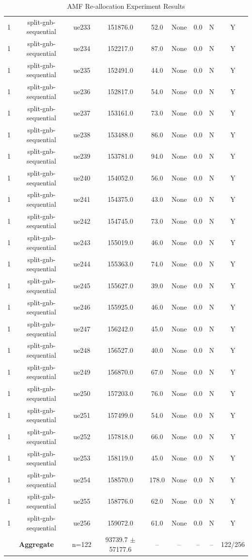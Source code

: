 \begin{table}[ht]
\begin{tabular}{|c|c|c|c|c|c|c|c|c|}
1 & split-gnb-sequential & ue233 & 151876.0 & 52.0 & None & 0.0 & N & Y \\
1 & split-gnb-sequential & ue234 & 152217.0 & 87.0 & None & 0.0 & N & Y \\
1 & split-gnb-sequential & ue235 & 152491.0 & 44.0 & None & 0.0 & N & Y \\
1 & split-gnb-sequential & ue236 & 152817.0 & 54.0 & None & 0.0 & N & Y \\
1 & split-gnb-sequential & ue237 & 153161.0 & 73.0 & None & 0.0 & N & Y \\
1 & split-gnb-sequential & ue238 & 153488.0 & 86.0 & None & 0.0 & N & Y \\
1 & split-gnb-sequential & ue239 & 153781.0 & 94.0 & None & 0.0 & N & Y \\
1 & split-gnb-sequential & ue240 & 154052.0 & 56.0 & None & 0.0 & N & Y \\
1 & split-gnb-sequential & ue241 & 154375.0 & 43.0 & None & 0.0 & N & Y \\
1 & split-gnb-sequential & ue242 & 154745.0 & 73.0 & None & 0.0 & N & Y \\
1 & split-gnb-sequential & ue243 & 155019.0 & 46.0 & None & 0.0 & N & Y \\
1 & split-gnb-sequential & ue244 & 155363.0 & 74.0 & None & 0.0 & N & Y \\
1 & split-gnb-sequential & ue245 & 155627.0 & 39.0 & None & 0.0 & N & Y \\
1 & split-gnb-sequential & ue246 & 155925.0 & 46.0 & None & 0.0 & N & Y \\
1 & split-gnb-sequential & ue247 & 156242.0 & 45.0 & None & 0.0 & N & Y \\
1 & split-gnb-sequential & ue248 & 156527.0 & 40.0 & None & 0.0 & N & Y \\
1 & split-gnb-sequential & ue249 & 156870.0 & 67.0 & None & 0.0 & N & Y \\
1 & split-gnb-sequential & ue250 & 157203.0 & 76.0 & None & 0.0 & N & Y \\
1 & split-gnb-sequential & ue251 & 157499.0 & 54.0 & None & 0.0 & N & Y \\
1 & split-gnb-sequential & ue252 & 157818.0 & 66.0 & None & 0.0 & N & Y \\
1 & split-gnb-sequential & ue253 & 158119.0 & 45.0 & None & 0.0 & N & Y \\
1 & split-gnb-sequential & ue254 & 158570.0 & 178.0 & None & 0.0 & N & Y \\
1 & split-gnb-sequential & ue255 & 158776.0 & 62.0 & None & 0.0 & N & Y \\
1 & split-gnb-sequential & ue256 & 159072.0 & 61.0 & None & 0.0 & N & Y \\
\multicolumn{2}{|c|}{\textbf{Aggregate}} & n=122 & 93739.7 $\pm$ 57177.6 & -- & -- & -- & -- & 122/256 \\
\hline
\end{tabular}
\caption{AMF Re-allocation Experiment Results}
\label{tab:amf_realloc}
\end{table}
